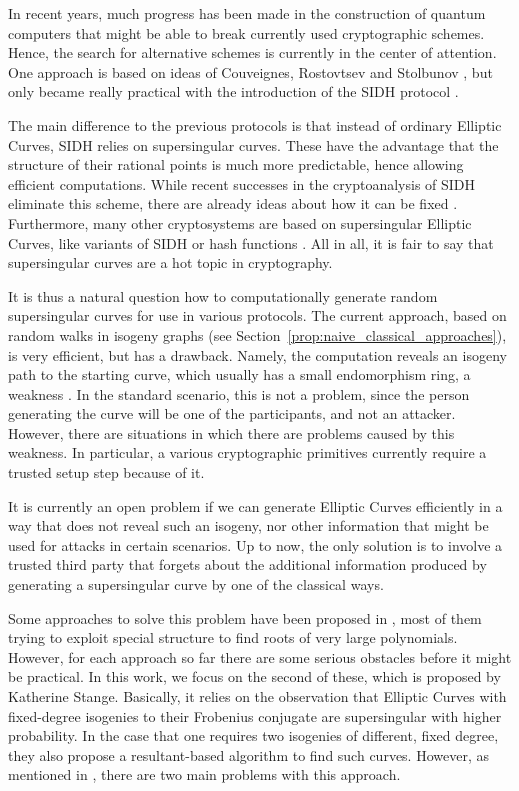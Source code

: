 
In recent years, much progress has been made in the construction of quantum computers that might be able to break currently used cryptographic schemes.
Hence, the search for alternative schemes is currently in the center of attention.
One approach is based on ideas of Couveignes, Rostovtsev and Stolbunov \cite{old_isogeny_crypto1, old_isogeny_crypto2, old_isogeny_crypto3}, but only became really practical with the introduction of the SIDH protocol \cite{sidh}.

The main difference to the previous protocols is that instead of ordinary Elliptic Curves, SIDH relies on supersingular curves.
These have the advantage that the structure of their rational points is much more predictable, hence allowing efficient computations.
While recent successes in the cryptoanalysis of SIDH \cite{sidh_broken} eliminate this scheme, there are already ideas about how it can be fixed \cite{sidh_fix1,sidh_fix2}.
Furthermore, many other cryptosystems are based on supersingular Elliptic Curves, like variants of SIDH \cite{csidh, osidh} or hash functions \cite{supersingular_hash_function}.
All in all, it is fair to say that supersingular curves are a hot topic in cryptography.

It is thus a natural question how to computationally generate random supersingular curves for use in various protocols.
The current approach, based on random walks in isogeny graphs (see Section~\ref{prop:naive_classical_approaches}), is very efficient, but has a drawback.
Namely, the computation reveals an isogeny path to the starting curve, which usually has a small endomorphism ring, a weakness \cite{endomorphism_ring_isogeny_path_equivalent}.
In the standard scenario, this is not a problem, since the person generating the curve will be one of the participants, and not an attacker.
However, there are situations in which there are problems caused by this weakness.
In particular, a various cryptographic primitives \cite{torsion_point_problem1, torsion_point_problem2} currently require a trusted setup step because of it.

It is currently an open problem if we can generate Elliptic Curves efficiently in a way that does not reveal such an isogeny, nor other information that might be used for attacks in certain scenarios.
Up to now, the only solution is to involve a trusted third party that forgets about the additional information produced by generating a supersingular curve by one of the classical ways.

Some approaches to solve this problem have been proposed in \cite{base_paper}, most of them trying to exploit special structure to find roots of very large polynomials.
However, for each approach so far there are some serious obstacles before it might be practical.
In this work, we focus on the second of these, which is proposed by Katherine Stange.
Basically, it relies on the observation that Elliptic Curves with fixed-degree isogenies to their Frobenius conjugate are supersingular with higher probability.
In the case that one requires two isogenies of different, fixed degree, they also propose a resultant-based algorithm to find such curves.
However, as mentioned in \cite{base_paper}, there are two main problems with this approach.

